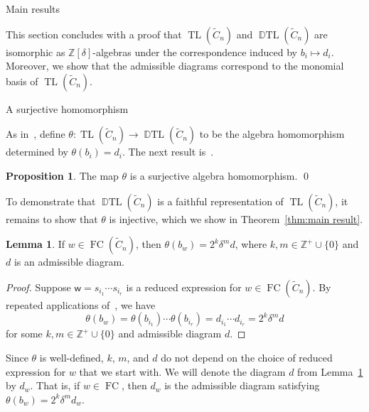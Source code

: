 \documentclass[11pt]{amsart}
\theoremstyle{definition}
\newtheorem{lemma}[theorem]{Lemma}
\newtheorem{proposition}[theorem]{Proposition}
\numberwithin{equation}{section}
\newcommand{\Z}{\mathbb{Z}}
\newcommand{\C}{\widetilde{C}}
\DeclareMathOperator{\TL}{TL}
\DeclareMathOperator{\DTL}{\mathbb{D}TL}
\renewcommand{\(}{\left(}
\renewcommand{\)}{\right)}
\newcommand{\w}{\mathsf{w}}
\DeclareMathOperator{\FC}{FC}
\begin{document}
\begin{section}{Main results}\label{sec:main results}

This section concludes with a proof that $\TL(\C_{n})$ and $\DTL(\C_n)$ are isomorphic as $\Z[\delta]$-algebras under the correspondence induced by $b_{i} \mapsto d_{i}$.  Moreover, we show that the admissible diagrams correspond to the monomial basis of $\TL(\C_{n})$.  


\begin{subsection}{A surjective homomorphism}\label{subsec:hom}

As in~\cite{Ernst2012}, define $\theta: \TL(\C_{n}) \to \DTL(\C_n)$ to be the algebra homomorphism determined by $\theta(b_{i})=d_{i}$.  The next result is~\cite[Proposition 4.1.3]{Ernst2012}.

\begin{proposition}\label{prop:surjective homomorphism}
The map $\theta$ is a surjective algebra homomorphism. \qed
\end{proposition}

To demonstrate that $\DTL(\C_n)$ is a faithful representation of $\TL(\C_n)$, it remains to show that $\theta$ is injective, which we show in Theorem~\ref{thm:main result}.

\begin{lemma}\label{lem:powers of 2 and delta for images of monomials}
If $w \in \FC(\C_{n})$, then $\theta(b_{w})=2^{k}\delta^{m}d$, where $k,m \in \Z^{+}\cup\{0\}$ and $d$ is an admissible diagram.
\end{lemma}

\begin{proof}
Suppose $\w=s_{i_{1}}\cdots s_{i_{r}}$ is a reduced expression for $w \in \FC(\C_{n})$. By repeated applications of~\cite[Proposition~5.5.1]{Ernst2012}, we have
\[
\theta(b_{w}) = \theta(b_{i_{1}}) \cdots \theta(b_{i_{r}}) = d_{i_{1}} \cdots d_{i_{r}} = 2^{k}\delta^{m}d
\]
for some $k,m \in \Z^{+}\cup\{0\}$ and admissible diagram $d$.  
\end{proof}

Since $\theta$ is well-defined, $k$, $m$, and $d$ do not depend on the choice of reduced expression for $w$ that we start with.  We will denote the diagram $d$ from Lemma~\ref{lem:powers of 2 and delta for images of monomials} by $d_{w}$.  That is, if $w \in \FC$, then $d_{w}$ is the admissible diagram satisfying $\theta(b_{w})=2^{k}\delta^{m}d_{w}$.


\end{subsection}
\end{section}
\end{document}
